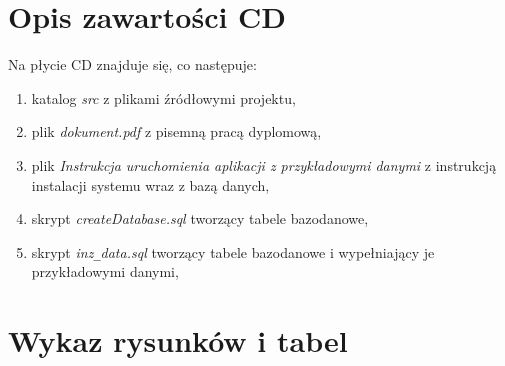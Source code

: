 \documentclass[a4paper,12pt,twoside]{article}
\begin{document}
\newpage
\section*{Opis zawartości CD}

Na płycie CD znajduje się, co następuje:
\begin{enumerate}[1)]
\item katalog \textit{src} z plikami źródłowymi projektu,
\item plik \textit{dokument.pdf} z pisemną pracą dyplomową,
\item plik \textit{Instrukcja uruchomienia aplikacji z przykładowymi danymi} z instrukcją instalacji systemu wraz z bazą danych,
\item skrypt \textit{createDatabase.sql} tworzący tabele bazodanowe,
\item skrypt \textit{inz}\verb!_!\textit{data.sql} tworzący tabele bazodanowe i wypełniający je przykładowymi danymi,
\end{enumerate}

\newpage
\section*{Wykaz rysunków i tabel}
\listoffigures
\listoftables
\end{document}
